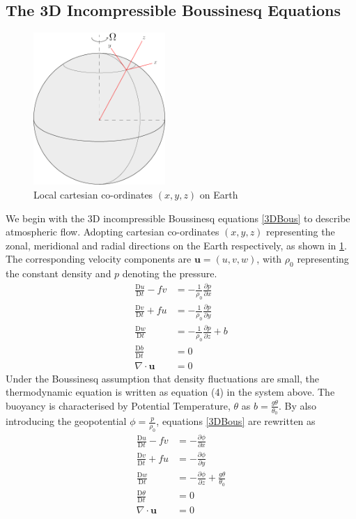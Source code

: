\subsection{The 3D Incompressible Boussinesq Equations}
\begin{figure}[h]
	\centering
	\includegraphics[width=5cm]{background/local_cartesian}
	\caption{Local cartesian co-ordinates $\left(x,y,z\right)$ on Earth}
	\label{fig:localcartesian}
\end{figure}
We begin with the $3$D incompressible Boussinesq equations \ref{3DBous} to describe atmospheric flow. Adopting cartesian co-ordinates $\left(x,y,z\right)$ representing the zonal, meridional and radial directions on the Earth respectively, as shown in \ref{fig:localcartesian}. The corresponding velocity components are $\bm{u}=\left(u,v,w\right)$, with $\rho_0$ representing the constant density and $p$ denoting the pressure.
\begin{equation}
	\begin{aligned}
		\frac{\mathrm{D}u}{\mathrm{D}t}	- fv  &= -\frac{1}{\rho_0}\frac{\partial p}{\partial x}\\
		\frac{\mathrm{D}v}{\mathrm{D}t}	+ fu  &= -\frac{1}{\rho_0}\frac{\partial p}{\partial y}\\
		\frac{\mathrm{D}w}{\mathrm{D}t} &= -\frac{1}{\rho_0}\frac{\partial p}{\partial z} + b\\
		\frac{\mathrm{D} b}{\mathrm{D}t} &= 0\\
		\nabla \cdot \bm{u} &= 0
	\end{aligned}
\label{3DBous}
\end{equation}
Under the Boussinesq assumption that density fluctuations are small, the thermodynamic equation is written as equation (4) in the system above. The buoyancy is characterised by Potential Temperature, $\theta$ as $b = \frac{g\theta}{\theta_0}$. By also introducing the geopotential $\phi = \frac{p}{\rho_0}$, equations \ref{3DBous} are rewritten as
\begin{equation}
	\begin{aligned}
		\frac{\mathrm{D}u}{\mathrm{D}t}	- fv  &= -\frac{\partial \phi}{\partial x}\\
		\frac{\mathrm{D}v}{\mathrm{D}t}	+ fu  &= -\frac{\partial \phi}{\partial y}\\
		\frac{\mathrm{D}w}{\mathrm{D}t} &= -\frac{\partial \phi}{\partial z} + \frac{g\theta}{\theta_0}\\
		\frac{\mathrm{D} \theta}{\mathrm{D}t} &= 0\\
		\nabla \cdot \bm{u} &= 0
	\end{aligned}
\label{3DBousPT}
\end{equation}
